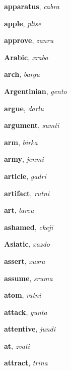 \documentclass[12pt]{book}
\begin{document}
\begin{description}
\item[ ] \textbf{apparatus}, \textit{cabra}

\item[ ] \textbf{apple}, \textit{plise}

\item[ ] \textbf{approve}, \textit{zanru}

\item[ ] \textbf{Arabic}, \textit{xrabo}

\item[ ] \textbf{arch}, \textit{bargu}

\item[ ] \textbf{Argentinian}, \textit{gento}

\item[ ] \textbf{argue}, \textit{darlu}

\item[ ] \textbf{argument}, \textit{sumti}

\item[ ] \textbf{arm}, \textit{birka}

\item[ ] \textbf{army}, \textit{jenmi}

\item[ ] \textbf{article}, \textit{gadri}

\item[ ] \textbf{artifact}, \textit{rutni}

\item[ ] \textbf{art}, \textit{larcu}

\item[ ] \textbf{ashamed}, \textit{ckeji}

\item[ ] \textbf{Asiatic}, \textit{xazdo}

\item[ ] \textbf{assert}, \textit{xusra}

\item[ ] \textbf{assume}, \textit{sruma}

\item[ ] \textbf{atom}, \textit{ratni}

\item[ ] \textbf{attack}, \textit{gunta}

\item[ ] \textbf{attentive}, \textit{jundi}

\item[ ] \textbf{at}, \textit{zvati}

\item[ ] \textbf{attract}, \textit{trina}


\end{description}
\end{document}
